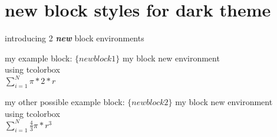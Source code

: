 \documentclass{beamer}
\begin{document}
\section{new block styles for dark theme}

\begin{frame}{introducing 2 \textbf{\emph{new}} block environments}
\begin{newblock1}{my example block:  $\{newblock1\}$}
    my block new environment\\
    using tcolorbox\\
    $\sum^N_{i=1}\pi * 2 * r$
\end{newblock1}
\begin{newblock2}{my other possible example block:  $\{newblock2\}$}
    my block new environment\\
    using tcolorbox\\
    $\sum^N_{i=1}\frac{4}{3}\pi * r^3$ 
   
\end{newblock2}

\end{frame}




\end{document}
